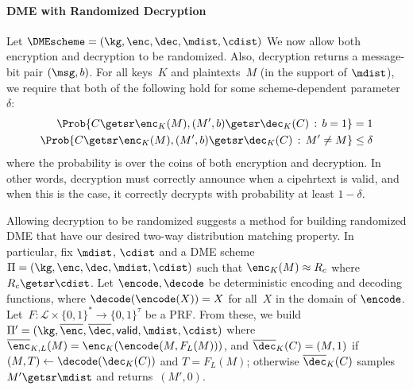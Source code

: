 \newcommand{\valid}{\textsf{valid}}
\paragraph{DME with Randomized Decryption}  
Let $\DMEscheme=(\kg,\enc,\dec,\mdist,\cdist)$ %
We now allow both encryption and decryption to be randomized.  
Also, decryption returns a message-bit pair $(\msg,b)$.  
For all keys~$K$ and
plaintexts~$M$ (in the support of $\mdist$), we require that both of
the following hold for some scheme-dependent parameter~$\delta$:
\begin{eqnarray*}
\Prob{C \getsr \enc_K(M), (M',b) \getsr \dec_K(C)\,:\, b=1}=1\\
\Prob{C \getsr \enc_K(M), (M',b) \getsr \dec_K(C) \,:\, M' \neq M} \leq \delta
\end{eqnarray*} 
where the probability is over
the coins of both encryption and decryption. In other words,
decryption must correctly announce when a cipehrtext is valid, and
when this is the case, it correctly decrypts with probability at
least $1-\delta$. 

Allowing decryption to be randomized suggests a method for
building randomized DME that have our desired two-way distribution matching
property.  In particular, fix $\mdist$, $\cdist$ and a DME
scheme~$\Pi=(\kg,\enc,\dec,\mdist,\cdist)$ such
that $\enc_K(M) \approx R_c$ where $R_c \getsr \cdist$.  Let
$\encode,\decode$ be deterministic encoding and decoding functions,
where $\decode(\encode(X))=X$ for all~$X$ in the domain of
$\encode$. Let~$F\colon\mathcal{L} \times \{0,1\}^* \to \{0,1\}^\tau$ be a
PRF.  
From these, we
build
$\Pi'=(\kg,\overline{\enc},\overline{\dec},\valid,\mdist,\cdist)$
where $\overline{\enc}_{K,L}(M)=\enc_K(\encode(M,F_L(M)))$, and
$\overline{\dec}_K(C) = (M,1)$ if $(M,T)\gets\decode(\dec_K(C))$
and $T=F_L(M)$; otherwise
$\overline{\dec}_K(C)$ samples $M' \getsr
\mdist$ and returns~$(M',0)$.  %

